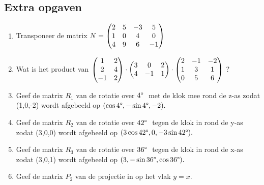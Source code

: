 \subsection{Extra opgaven}
\begin{enumerate}
	\item  Transponeer de matrix 
	$ N = \begin{pmatrix}  2 & 5 & -3 &  5 \\  1 &  0 & 4 & 0 \\ 4 & 9 & 6 & -1  \end{pmatrix}$
	
	\item Wat is het product van 
	$ \begin{pmatrix}  1 & 2  \\  2 &  4 \\  -1 & 2  \end{pmatrix} \cdot 
	\begin{pmatrix}  3 & 0 & 2  \\  4 &  -1 & 1  \end{pmatrix}  \cdot  
	\begin{pmatrix}   2 & -1 & -2  \\  1 &  3 & 1  \\ 0 & 5 & 6   \end{pmatrix} $	?
	
	\item Geef de matrix  \textit{$ R_1  $} van de rotatie over $ 4\degree \  $  met de klok mee rond de  z-as zodat (1,0,-2) wordt afgebeeld op $ (\cos 4\degree , -\sin 4\degree , -2) . $ \\
	
	\item Geef de matrix  \textit{$ R_2 $} van de rotatie over $ 42\degree \  $ tegen de klok in rond de  y-as zodat (3,0,0) wordt afgebeeld op $ (3\cos 42\degree , 0,  -3\sin 42\degree ). $ \\ 
	
	\item Geef de matrix  \textit{$ R_3 $} van de rotatie over $ 36\degree \  $ tegen de klok in rond de  x-as zodat (3,0,1) wordt afgebeeld op $ (3, -\sin 36\degree ,  \cos 36\degree ). $ \\
	
	\item Geef de matrix  \textit{$ P_2 $} van de projectie  in \RD op het vlak $  y=x $.
\end{enumerate}


